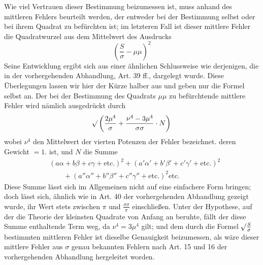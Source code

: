 Wie viel Vertrauen dieser Bestimmung beizumessen ist, muss anhand des mittleren Fehlers beurteilt werden, der entweder bei der Bestimmung selbst oder bei ihrem Quadrat zu befürchten ist; im letzteren Fall ist dieser mittlere Fehler die Quadratwurzel
aus dem Mittelwert des Ausdrucks
\[
\left(\frac S\sigma-\mu\mu\right)^2
\]
Seine Entwicklung ergibt sich aus einer ähnlichen Schlussweise wie derjenigen, die in der vorhergehenden Abhandlung, Art. 39 ff., dargelegt wurde. Diese Überlegungen lassen wir hier der Kürze halber aus und geben nur die Formel selbst an. Der bei der Bestimmung des Quadrats \(\mu\mu\) zu befürchtende mittlere Fehler wird nämlich ausgedrückt durch
\[
\mathord{{}^{}\!\surd}\left(\frac{2\mu^4}{\sigma}+\frac{\nu^4-3\mu^4}{\sigma\sigma}\cdot N\right)
\]
wobei \(\nu^4\) den Mittelwert der vierten Potenzen der Fehler bezeichnet. deren Gewicht \(=1.\) ist, und \(N\) die Summe
\[
\begin{aligned}
&(a\alpha+b\beta+c\gamma+\text{etc.})^2+(a'\alpha'+b'\beta'+c'\gamma'+\text{etc.})^2\\
&\qquad+(a''\alpha''+b''\beta''+c''\gamma''+\text{etc.})^2\text{etc.}
\end{aligned}
\]
Diese Summe lässt sich im Allgemeinen nicht auf eine einfachere Form bringen; doch lässt sich, ähnlich wie in Art. 40 der vorhergehenden Abhandlung gezeigt wurde, ihr Wert stets zwischen \(\pi\) und \(\frac{\sigma\sigma}{\pi}\) einschließen. Unter der Hypothese, auf der die Theorie der kleinsten Quadrate von Anfang an beruhte, fällt der diese Summe enthaltende Term weg, da \(\nu^4=3\mu^4\) gilt; und dem durch die Formel \(\mathord{{}^{}\!\surd}\frac S\sigma\) bestimmten mittleren Fehler ist dieselbe Genauigkeit beizumessen, als wäre dieser mittlere Fehler aus \(\sigma\) genau bekannten Fehlern nach Art. 15 und 16 der vorhergehenden Abhandlung hergeleitet worden.

